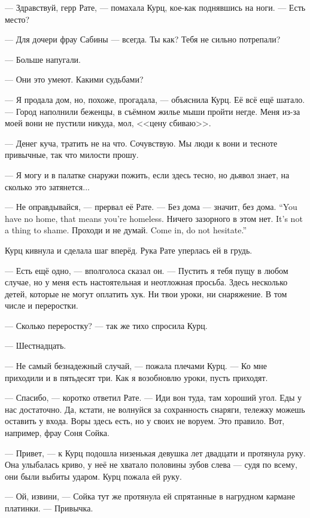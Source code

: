 --- Здравствуй, герр Рате, --- помахала Курц, кое-как поднявшись на ноги.
--- Есть место?

--- Для дочери фрау Сабины --- всегда.
Ты как?
Тебя не сильно потрепали?

--- Больше напугали.

--- Они это умеют.
Какими судьбами?

--- Я продала дом, но, похоже, прогадала, --- объяснила Курц.
Её всё ещё шатало.
--- Город наполнили беженцы, в съёмном жилье мыши пройти негде.
Меня из-за моей вони не пустили никуда, мол, <<цену сбиваю>>.

--- Денег куча, тратить не на что.
Сочувствую.
Мы люди к вони и тесноте привычные, так что милости прошу.

--- Я могу и в палатке снаружи пожить, если здесь тесно, но дьявол знает, на сколько это затянется...

--- Не оправдывайся, --- прервал её Рате.
{--- Без дома --- значит, без дома.}
{``You have no home, that means you're homeless.}
{Ничего зазорного в этом нет.}
{It's not a thing to shame.}
{Проходи и не думай.}
{Come in, do not hesitate.''}

Курц кивнула и сделала шаг вперёд.
Рука Рате уперлась ей в грудь.

--- Есть ещё одно, --- вполголоса сказал он.
--- Пустить я тебя пущу в любом случае, но у меня есть настоятельная и неотложная просьба.
Здесь несколько детей, которые не могут оплатить хук.
Ни твои уроки, ни снаряжение.
В том числе и переростки.

--- Сколько переростку? --- так же тихо спросила Курц.

--- Шестнадцать.

--- Не самый безнадежный случай, --- пожала плечами Курц.
--- Ко мне приходили и в пятьдесят три.
Как я возобновлю уроки, пусть приходят.

--- Спасибо, --- коротко ответил Рате.
--- Иди вон туда, там хороший угол.
Еды у нас достаточно.
Да, кстати, не волнуйся за сохранность снаряги, тележку можешь оставить у входа.
Воры здесь есть, но у своих не воруем.
Это правило.
Вот, например, фрау Соня Сойка.

--- Привет, --- к Курц подошла низенькая девушка лет двадцати и протянула руку.
Она улыбалась криво, у неё не хватало половины зубов слева --- судя по всему, они были выбиты ударом.
Курц пожала ей руку.

--- Ой, извини, --- Сойка тут же протянула ей спрятанные в нагрудном кармане платинки.
--- Привычка.

